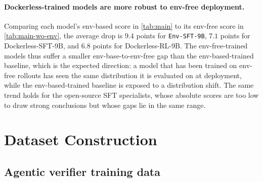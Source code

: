 \documentclass[]{arxiv_template}
\newcommand{\approach}{Dockerless\xspace}
\begin{document}
\paragraph{\approach-trained models are more robust to env-free deployment.}
Comparing each model's env-based score in \cref{tab:main} to its env-free score in \cref{tab:main-wo-env}, the average drop is $9.4$ points for \texttt{Env-SFT-9B}, $7.1$ points for \approach-SFT-9B, and $6.8$ points for \approach-RL-9B.
The env-free-trained models thus suffer a smaller env-base-to-env-free gap than the env-based-trained baseline, which is the expected direction: a model that has been trained on env-free rollouts has seen the same distribution it is evaluated on at deployment, while the env-based-trained baseline is exposed to a distribution shift.
The same trend holds for the open-source SFT specialists, whose absolute scores are too low to draw strong conclusions but whose gaps lie in the same range.


\section{Dataset Construction}
\label{app:data}

\subsection{Agentic verifier training data}
\label{app:data-verifier}
\end{document}
